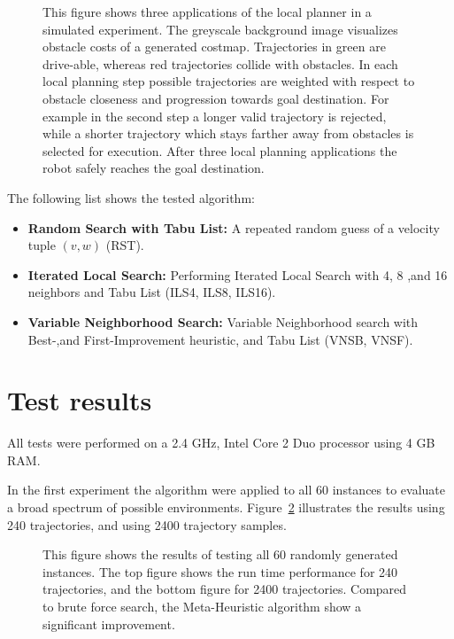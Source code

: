 \begin{figure}[thpb]
     \footnotesize
      \centering
      \setlength\fboxsep{0pt}
      \setlength\fboxrule{0.5pt}
       \def\svgwidth{0.7\textwidth}
       
		\caption{This figure shows three applications of the local planner in a simulated experiment. The greyscale background image visualizes obstacle costs of a generated costmap. Trajectories in green are drive-able, whereas red trajectories collide with obstacles. In each local planning step possible trajectories are weighted with respect to obstacle closeness and progression towards goal destination. For example in the second step a longer valid trajectory is rejected, while a shorter trajectory which stays farther away from obstacles is selected for execution. After three local planning applications the robot safely reaches the goal destination.}
		\label{fig:fig_instances_detail}
\end{figure}

The following list shows the tested algorithm:
\begin{itemize}
\item{\bf{Random Search with Tabu List:}} A repeated random guess of a velocity tuple $(v,w)$ (RST).
\item{\bf{Iterated Local Search:}} Performing Iterated Local Search with 4, 8 ,and 16 neighbors and Tabu List (ILS4, ILS8, ILS16).
\item{\bf{Variable Neighborhood Search:}} Variable Neighborhood search with Best-,and First-Improvement heuristic, and Tabu List (VNSB, VNSF).
\end{itemize}

\section{Test results}\label{sec:testresults}
All tests were performed on a 2.4 GHz, Intel Core 2 Duo processor using 4 GB RAM. 

In the first experiment the algorithm were applied to all 60 instances to evaluate a broad spectrum of possible environments. 
Figure~\ref{fig:fig_allworlds} illustrates the results using 240 trajectories, and using 2400 trajectory samples.
   \begin{figure}[thpb]
        \footnotesize
      \centering
      \def\svgwidth{0.7\textwidth}
      
      \caption{This figure shows the results of testing all 60 randomly generated instances. The top figure shows the run time performance for 240 trajectories, and the bottom figure for 2400 trajectories. Compared to brute force search, the Meta-Heuristic algorithm show a significant improvement. }
      \label{fig:fig_allworlds}
   \end{figure}


